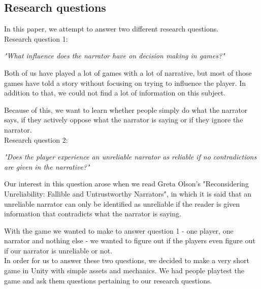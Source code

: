 \subsection{Research questions}
\label{Method_Research}

In this paper, we attempt to answer two different research questions.\\

Research question 1:
\begin{center}
\textit{"What influence does the narrator have on decision making in games?"}
\end{center}
Both of us have played a lot of games with a lot of narrative, but most of those games have told a story without focusing on trying to influence the player. In addition to that, we could not find a lot of information on this subject.

Because of this, we want to learn whether people simply do what the narrator says, if they actively oppose what the narrator is saying or if they ignore the narrator. \\

Research question 2:
\begin{center}
\textit{"Does the player experience an unreliable narrator as reliable if no contradictions are given in the narrative?"}
\end{center}
Our interest in this question arose when we read Greta Olson's "Reconsidering Unreliability: Fallible and Untrustworthy Narrators"\cite{Olson}, in which it is said that an unreliable narrator can only be identified as unreliable if the reader is given information that contradicts what the narrator is saying. 

With the game we wanted to make to answer question 1 - one player, one narrator and nothing else - we wanted to figure out if the players even figure out if our narrator is unreliable or not.\\

In order for us to answer these two questions, we decided to make a very short game in Unity with simple assets and mechanics. We had people playtest the game and ask them questions pertaining to our research questions.